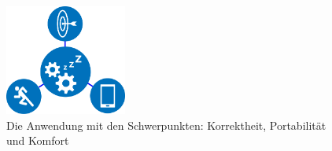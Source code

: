 \begin{figure}[h] 
  \begin{center}
    \includegraphics[width=4cm]{img/all}
    \caption[Schwerpuntke der Anwendung]{Die Anwendung mit den Schwerpunkten: Korrektheit, Portabilität und Komfort \label{fig:emphasis}}
  \end{center}
\end{figure}